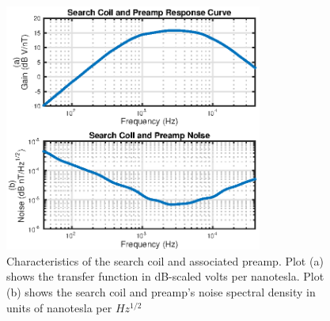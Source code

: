 \begin{figure}[t]
\begin{center}
\includegraphics[width=20pc]{figures/vpm_figures/searchcoil_response_2up.eps}
\caption[Characteristics of the search coil and associated preamp]{Characteristics of the search coil and associated preamp. Plot (a) shows the transfer function in dB-scaled volts per nanotesla. Plot (b) shows the search coil and preamp's noise spectral density in units of nanotesla per $Hz^{1/2}$}
\label{fig:searchcoil}
\end{center}
\end{figure}


